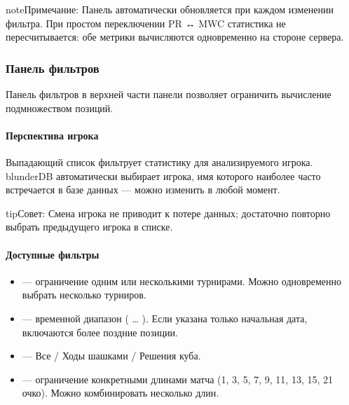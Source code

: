 \documentclass[letterpaper,10pt,russian]{sphinxmanual}
\begin{document}
\begin{sphinxadmonition}{note}{Примечание:}
\sphinxAtStartPar
Панель автоматически обновляется при каждом изменении фильтра. При простом переключении PR ↔ MWC статистика не пересчитывается: обе метрики вычисляются одновременно на стороне сервера.
\end{sphinxadmonition}


\subsubsection{Панель фильтров}
\label{\detokenize{manuel:barre-de-filtre}}
\sphinxAtStartPar
Панель фильтров в верхней части панели позволяет ограничить вычисление подмножеством позиций.


\paragraph{Перспектива игрока}
\label{\detokenize{manuel:perspective-joueur}}
\sphinxAtStartPar
Выпадающий список  фильтрует статистику для анализируемого игрока. blunderDB автоматически выбирает игрока, имя которого наиболее часто встречается в базе данных — можно изменить в любой момент.

\begin{sphinxadmonition}{tip}{Совет:}
\sphinxAtStartPar
Смена игрока не приводит к потере данных; достаточно повторно выбрать предыдущего игрока в списке.
\end{sphinxadmonition}


\paragraph{Доступные фильтры}
\label{\detokenize{manuel:filtres-disponibles}}\begin{itemize}
\item {} 
\sphinxAtStartPar
{} — ограничение одним или несколькими турнирами. Можно одновременно выбрать несколько турниров.

\item {} 
\sphinxAtStartPar
{} — временной диапазон ( … ). Если указана только начальная дата, включаются более поздние позиции.

\item {} 
\sphinxAtStartPar
{} — Все / Ходы шашками / Решения куба.

\item {} 
\sphinxAtStartPar
{} — ограничение конкретными длинами матча (1, 3, 5, 7, 9, 11, 13, 15, 21 очко). Можно комбинировать несколько длин.

\end{itemize}
\end{document}
